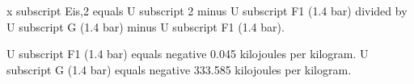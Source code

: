 x subscript Eis,2 equals U subscript 2 minus U subscript F1 (1.4 bar) divided by U subscript G (1.4 bar) minus U subscript F1 (1.4 bar).  

U subscript F1 (1.4 bar) equals negative 0.045 kilojoules per kilogram.  
U subscript G (1.4 bar) equals negative 333.585 kilojoules per kilogram.